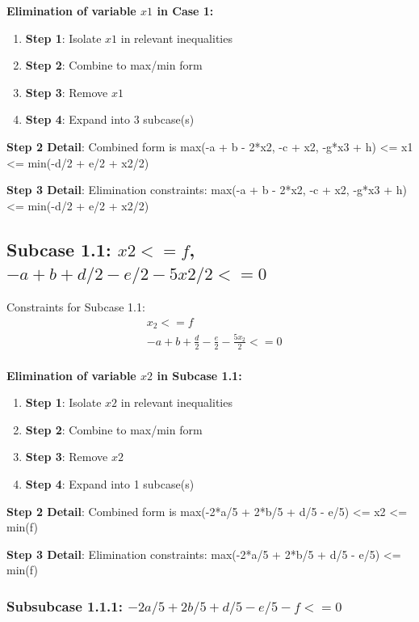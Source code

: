 \documentclass{article}
\begin{document}
\textbf{Elimination of variable $x1$ in Case 1:}

\begin{enumerate}
\item \textbf{Step 1}: Isolate $x1$ in relevant inequalities
\item \textbf{Step 2}: Combine to max/min form
\item \textbf{Step 3}: Remove $x1$
\item \textbf{Step 4}: Expand into 3 subcase(s)
\end{enumerate}

\textbf{Step 2 Detail}: Combined form is max(-a + b - 2*x2, -c + x2, -g*x3 + h) <= x1 <= min(-d/2 + e/2 + x2/2)

\textbf{Step 3 Detail}: Elimination constraints:
\quad max(-a + b - 2*x2, -c + x2, -g*x3 + h) <= min(-d/2 + e/2 + x2/2)

\subsection{Subcase 1.1: $x2 <= f$, $-a + b + d/2 - e/2 - 5 x2/2 <= 0$}

Constraints for Subcase 1.1:
\begin{align}
& x_{2} <= f \\
& - a + b + \frac{d}{2} - \frac{e}{2} - \frac{5 x_{2}}{2} <= 0 \\
\end{align}

\textbf{Elimination of variable $x2$ in Subcase 1.1:}

\begin{enumerate}
\item \textbf{Step 1}: Isolate $x2$ in relevant inequalities
\item \textbf{Step 2}: Combine to max/min form
\item \textbf{Step 3}: Remove $x2$
\item \textbf{Step 4}: Expand into 1 subcase(s)
\end{enumerate}

\textbf{Step 2 Detail}: Combined form is max(-2*a/5 + 2*b/5 + d/5 - e/5) <= x2 <= min(f)

\textbf{Step 3 Detail}: Elimination constraints:
\quad max(-2*a/5 + 2*b/5 + d/5 - e/5) <= min(f)

\subsubsection{Subsubcase 1.1.1: $-2 a/5 + 2 b/5 + d/5 - e/5 - f <= 0$}
\end{document}
